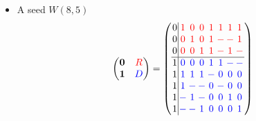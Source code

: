 \documentclass{beamer}
\newcommand{\rred}[1]{\textcolor{red}{#1}}
\newcommand{\bblue}[1]{\textcolor{blue}{#1}}
\begin{document}
\begin{frame}

  \begin{itemize}
  \item A seed $W(8,5)$
    \[
      \begin{pmatrix}
        \textbf{0} & \rred{R} \\
        \textbf{1} & \bblue{D}
      \end{pmatrix}
      =
      \left(
        \arraycolsep=1.0pt\def\arraystretch{1.0}
        \begin{array}{c|ccccccc}
          0&\rred{1}&\rred{0}&\rred{0}&\rred{1}&\rred{1}&\rred{1}&\rred{1}\\
          0&\rred{0}&\rred{1}&\rred{0}&\rred{1}&\rred{-}&\rred{-}&\rred{1}\\
          0&\rred{0}&\rred{0}&\rred{1}&\rred{1}&\rred{-}&\rred{1}&\rred{-}\\ \hline
          1&\bblue{0}&\bblue{0}&\bblue{0}&\bblue{1}&\bblue{1}&\bblue{-}&\bblue{-}\\
          1&\bblue{1}&\bblue{1}&\bblue{1}&\bblue{-}&\bblue{0}&\bblue{0}&\bblue{0}\\
          1&\bblue{1}&\bblue{-}&\bblue{-}&\bblue{0}&\bblue{-}&\bblue{0}&\bblue{0}\\
          1&\bblue{-}&\bblue{1}&\bblue{-}&\bblue{0}&\bblue{0}&\bblue{1}&\bblue{0}\\
          1&\bblue{-}&\bblue{-}&\bblue{1}&\bblue{0}&\bblue{0}&\bblue{0}&\bblue{1}\\
        \end{array}
      \right)
    \]
  \end{itemize}
  
\end{frame}
\end{document}
